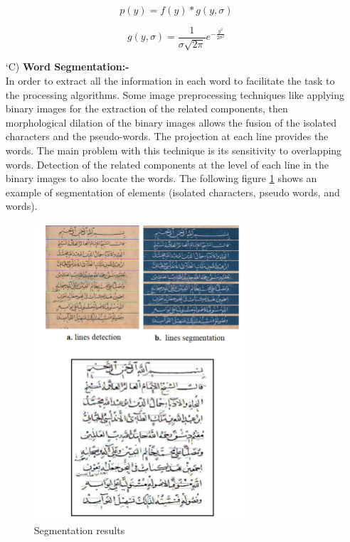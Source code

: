 \begin{itemize}[labelindent=1em,labelsep=0.25cm,leftmargin=*]
        \begin{equation}
            p(y) = f(y)*g(y,\sigma) 
        \label{equ:gaussian-filter}
        \end{equation}
        
        \begin{equation}
            g(y, \sigma) = \frac{1}{\sigma \sqrt{2 \pi}} e^{-\frac{y^2}{2\sigma^2}}
        \label{equ:signal-function}
        \end{equation}
        
        \item[\char `C)] \textbf{Word Segmentation:-} \\
        In order to extract all the information in each word to facilitate the task to the processing algorithms. Some image preprocessing techniques like applying binary images for the extraction of the related components, then morphological dilation of the binary images allows the fusion of the isolated characters and the pseudo-words. The projection at each line provides the words. The main problem with this technique is its sensitivity to overlapping words. Detection of the related components at the level of each line in the binary images to also locate the words.
        The following figure \ref{fig:noureddine-word-line} shows an example of segmentation of elements (isolated characters, pseudo words, and words).
        
        \begin{figure}[!htb]
            \centering
            \includegraphics[width=8cm]{images/noureddine-line-word-segmentation.png}
            \caption{Segmentation results}
            \label{fig:noureddine-word-line}
        \end{figure}
        

\end{itemize}
